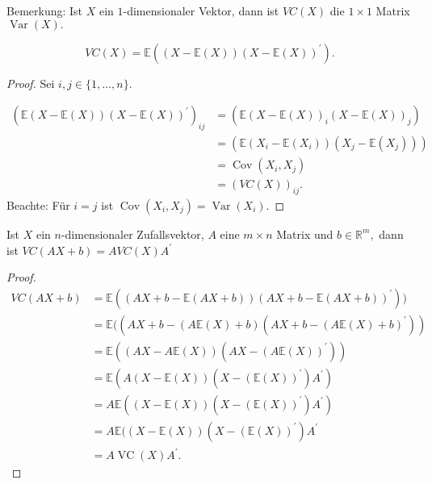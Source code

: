\documentclass{tstextbook}
\DeclareMathOperator{\Cov}{Cov}
\DeclareMathOperator{\VC}{VC} %
\DeclareMathOperator{\Var}{Var}
\begin{document}
\begin{remark}
	Bemerkung: Ist $X$ ein $1$-dimensionaler Vektor, dann ist $VC(X)$ die $1\times1$ Matrix $\Var(X).$
\end{remark}

\begin{theorem}
    \[ VC(X)=\mathbb{E}\left((X-\mathbb{E}(X))(X-\mathbb{E}(X))^\prime \right).\]
\end{theorem}

\begin{proof}
    Sei $i,j\in\lbrace1,\ldots,n\rbrace.$

\begin{equation*}
\begin{split}
\left(\mathbb{E}(X-\mathbb{E}(X))(X-\mathbb{E}(X))^\prime\right)_{ij} & = \left(\mathbb{E}(X-\mathbb{E}(X))_i(X-\mathbb{E}(X))_j\right) \\
 & = \left(\mathbb{E}(X_i-\mathbb{E}(X_i))(X_j-\mathbb{E}(X_j))\right) \\
 &= \Cov(X_i,X_j) \\
 &= (VC(X))_{ij}. 
\end{split}
\end{equation*}
Beachte: Für $i=j$ ist $\Cov(X_i,X_j)=\Var(X_i). $
    
\end{proof}

\begin{theorem}
    Ist $X$ ein $n$-dimensionaler Zufallsvektor, $A$ eine $m\times n$ Matrix und $b\in\mathbb{R}^m,$ dann ist $VC(AX+b)=AVC(X)A^\prime$
\end{theorem}
   
        
\begin{proof}
\begin{align*}
    	VC(AX+b) & = \mathbb{E}((AX+b-\mathbb{E}(AX+b))(AX+b-\mathbb{E}(AX+b))^\prime)) \\
    	& = \mathbb{E}((AX+b-(A\mathbb{E}(X)+b)(AX+b-(A\mathbb{E}(X)+b)^\prime)) \\
    	& = \mathbb{E}((AX-A\mathbb{E}(X))(AX-(A\mathbb{E}(X))^\prime)) \\
    	& = \mathbb{E}(A(X-\mathbb{E}(X))(X-(\mathbb{E}(X))^\prime)A^\prime) \\
    	& = A\mathbb{E}((X-\mathbb{E}(X))(X-(\mathbb{E}(X))^\prime)A^\prime) \\
    	& = A\mathbb{E}((X-\mathbb{E}(X))(X-(\mathbb{E}(X))^\prime)A^\prime \\
    	& = A\VC(X)A^\prime.
\end{align*} 
\end{proof}
\end{document}
